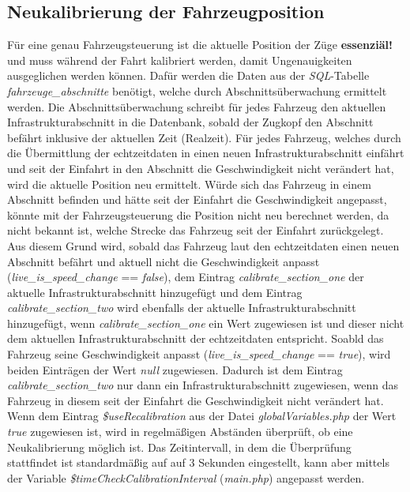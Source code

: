 \subsection{Neukalibrierung der Fahrzeugposition}  \label{main_5}
Für eine genau Fahrzeugsteuerung ist die aktuelle Position der Züge \textbf{essenziäl!} und muss während der Fahrt kalibriert werden, damit Ungenauigkeiten ausgeglichen werden können. Dafür werden die Daten aus der \textit{SQL}-Tabelle \textit{fahrzeuge\_abschnitte} benötigt, welche durch Abschnittsüberwachung ermittelt werden. Die Abschnittsüberwachung schreibt für jedes Fahrzeug den aktuellen Infrastrukturabschnitt in die Datenbank, sobald der Zugkopf den Abschnitt befährt inklusive der aktuellen Zeit (Realzeit). Für jedes Fahrzeug, welches durch die Übermittlung der \Gls{echtzeitdaten} in einen neuen Infrastrukturabschnitt einfährt und seit der Einfahrt in den Abschnitt die Geschwindigkeit nicht verändert hat, wird die aktuelle Position neu ermittelt. Würde sich das Fahrzeug in einem Abschnitt befinden und hätte seit der Einfahrt die Geschwindigkeit angepasst, könnte mit der Fahrzeugsteuerung die Position nicht neu berechnet werden, da nicht bekannt ist, welche Strecke das Fahrzeug seit der Einfahrt zurückgelegt. Aus diesem Grund wird, sobald das Fahrzeug laut den \Gls{echtzeitdaten} einen neuen Abschnitt befährt und aktuell nicht die Geschwindigkeit anpasst (\textit{live\_is\_speed\_change} == \textit{false}), dem Eintrag \textit{calibrate\_section\_one} der aktuelle Infrastrukturabschnitt hinzugefügt und dem Eintrag \textit{calibrate\_section\_two} wird ebenfalls der aktuelle Infrastrukturabschnitt hinzugefügt, wenn \textit{calibrate\_section\_one} ein Wert zugewiesen ist und dieser nicht dem aktuellen Infrastrukturabschnitt der \Gls{echtzeitdaten} entspricht. Soabld das Fahrzeug seine Geschwindigkeit anpasst (\textit{live\_is\_speed\_change} == \textit{true}), wird beiden Einträgen der Wert \textit{null} zugewiesen. Dadurch ist dem Eintrag \textit{calibrate\_section\_two} nur dann ein Infrastrukturabschnitt zugewiesen, wenn das Fahrzeug in diesem seit der Einfahrt die Geschwindigkeit nicht verändert hat. Wenn dem Eintrag \textit{\$useRecalibration} aus der Datei \textit{globalVariables.php} der Wert \textit{true} zugewiesen ist, wird in regelmäßigen Abständen überprüft, ob eine Neukalibrierung möglich ist. Das Zeitintervall, in dem die Überprüfung stattfindet ist standardmäßig auf auf 3 Sekunden eingestellt, kann aber mittels der Variable \textit{\$timeCheckCalibrationInterval} (\textit{main.php}) angepasst werden.

